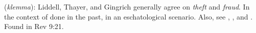 \item[Fraud,]

(\textit{klemma}):
Liddell, Thayer, and Gingrich generally agree on \emph{theft} and \emph{fraud}. In the context of done in the past, in an eschatological scenario. Also, see , , and .
Found in Rev 9:21.
